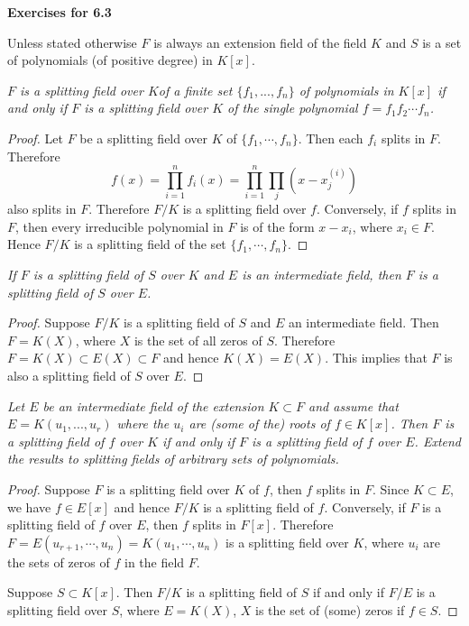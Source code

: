 \begin{center}
\begin{large}
    \textbf{Exercises for 6.3}
\end{large}
\end{center}
Unless stated otherwise $F$ is always an extension field of the field $K$ and $S$ is a set of polynomials (of positive degree) in $K[x]$.
\begin{problem}\em
$F$ is a splitting field over $K$of a finite set $\{f_1, ..., f_n\}$ of polynomials in $K[x]$ if and only if $F$ is a splitting field over $K$ of the single polynomial $f=f_1 f_2\cdots f_n$.
\end{problem}
\begin{proof}
Let $F$ be a splitting field over $K$ of $\{f_1,\cdots,f_n\}$. Then each $f_i$ splits in $F$. Therefore 
$$
f\left( x \right) =\prod_{i=1}^n{f_i\left( x \right)}=\prod_{i=1}^n{\prod_j{\left( x-x_{j}^{\left( i \right)} \right)}}
$$
also splits in $F$. Therefore $F/K$ is a splitting field over $f$. Conversely, if $f$ splits in $F$, then every irreducible polynomial in $F$ is of the form $x-x_i$, where $x_i\in F$. Hence $F/K$ is a splitting field of the set $\{f_1,\cdots,f_n\}$.
\end{proof}
\begin{problem}\em
If $F$ is a splitting field of $S$ over $K$ and $E$ is an intermediate field, then $F$ is a splitting field of $S$ over $E$.
\end{problem}
\begin{proof}
Suppose $F/K$ is a splitting field of $S$ and $E$ an intermediate field. Then $F=K(X)$, where $X$ is the set of all zeros of $S$. Therefore $F=K(X)\subset E(X)\subset F$ and hence $K(X)=E(X)$. This implies that $F$ is also a splitting field of $S$ over $E$.
\end{proof}
\begin{problem}\em
Let $E$ be an intermediate field of the extension $K\subset F$ and assume that $E=K(u_1, ..., u_r)$ where the $u_i$ are (some of the) roots of $f\in K[x]$. Then $F$ is a splitting field of $f$ over $K$ if and only if $F$ is a splitting field of $f$ over $E$. Extend the results to splitting fields of arbitrary sets of polynomials.
\end{problem}
\begin{proof}
Suppose $F$ is a splitting field over $K$ of $f$, then $f$ splits in $F$. Since $K\subset E$, we have $f\in E[x]$ and hence $F/K$ is a splitting field of $f$. Conversely, if $F$ is a splitting field of $f$ over $E$, then $f$ splits in $F[x]$. Therefore $F=E(u_{r+1},\cdots,u_n)=K(u_1,\cdots,u_n)$ is a splitting field over $K$, where $u_i$ are the sets of zeros of $f$ in the field $F$.\par
Suppose $S\subset K[x]$. Then $F/K$ is a splitting field of $S$ if and only if $F/E$ is a splitting field over $S$, where $E=K(X)$, $X$ is the set of (some) zeros if $f\in S$.
\end{proof}
